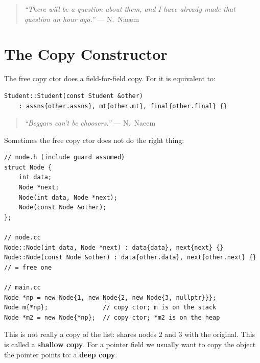 \begin{quote}
\textit{``There will be a question about them, and I have already made that
question an hour ago.''} --- N.~Naeem
\end{quote}

\section{The Copy Constructor}
The free copy ctor does a field-for-field copy. For  it is
equivalent to:
\begin{lstlisting}[style=cpp]
Student::Student(const Student &other)
    : assns{other.assns}, mt{other.mt}, final{other.final} {}
\end{lstlisting}
\begin{quote}
\textit{``Beggars can't be choosers.''} --- N.~Naeem
\end{quote}
Sometimes the free copy ctor does not do the right thing:
\begin{lstlisting}[style=cpp]
// node.h (include guard assumed)
struct Node {
    int data;
    Node *next;
    Node(int data, Node *next);
    Node(const Node &other);
};

// node.cc
Node::Node(int data, Node *next) : data{data}, next{next} {}
Node::Node(const Node &other) : data{other.data}, next{other.next} {}  // = free one

// main.cc
Node *np = new Node{1, new Node{2, new Node{3, nullptr}}};
Node m{*np};               // copy ctor; m is on the stack
Node *m2 = new Node{*np};  // copy ctor; *m2 is on the heap
\end{lstlisting}

\begin{center}
\end{center}

This is not really a copy of the list:  shares nodes 2 and 3 with the
original. This is called a \textbf{shallow copy}. For a pointer field we usually
want to copy the object the pointer points to: a \textbf{deep copy}.

